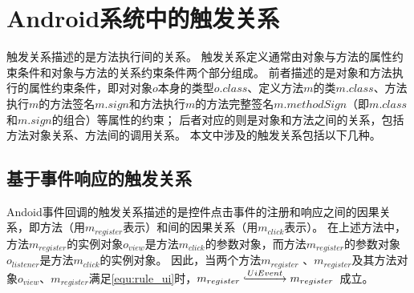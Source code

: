 	
\section{Android系统中的触发关系}

触发关系描述的是方法执行间的关系。
触发关系定义通常由对象与方法的属性约束条件和对象与方法的关系约束条件两个部分组成。
前者描述的是对象和方法执行的属性约束条件，即对对象$o$本身的类型$o.class$、定义方法$m$的类$m.class$、方法执行$m$的方法签名$m.sign$和方法执行$m$的方法完整签名$m.methodSign$（即$m.class$和$m.sign$的组合）等属性的约束；
后者对应的则是对象和方法之间的关系，包括方法对象关系、方法间的调用关系。
本文中涉及的触发关系包括以下几种。



\subsection{基于事件响应的触发关系}


Andoid事件回调的触发关系描述的是控件点击事件的注册和响应之间的因果关系，即方法（用$m_{register}$表示）和间的因果关系（用$m_{click}$表示）。
在上述方法中，方法$m_{register}$的实例对象$o_{view}$是方法$m_{click}$的参数对象，而方法$m_{register}$的参数对象$o_{listener}$是方法$m_{click}$的实例对象。
因此，当两个方法$m_{register}$ 、$m_{register}$及其方法对象$o_{view}$、$m_{register}$满足\autoref{equ:rule_ui}时，$m_{register} \lhook\joinrel\xrightarrow{UiEvent}  m_{register}  $ 成立。


